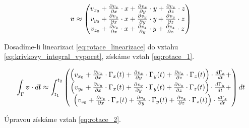 \begin{equation}
\label{eq:rotace_linearizace}
\boldsymbol{v} \approx \begin{pmatrix}
v_{x_0} + \frac{\partial v_x}{\partial x} \cdot x + \frac{\partial v_x}{\partial y} \cdot y + \frac{\partial v_x}{\partial z} \cdot z \\
v_{y_0} + \frac{\partial v_y}{\partial x} \cdot x + \frac{\partial v_y}{\partial y} \cdot y + \frac{\partial v_y}{\partial z} \cdot z \\
v_{z_0} + \frac{\partial v_z}{\partial x} \cdot x + \frac{\partial v_z}{\partial y} \cdot y + \frac{\partial v_z}{\partial z} \cdot z
\end{pmatrix}
\end{equation}

Dosadíme-li linearizaci \eqref{eq:rotace_linearizace} do vztahu \eqref{eq:krivkovy_integral_vypocet}, získáme vztah \eqref{eq:rotace_1}.

\begin{equation}
\label{eq:rotace_1}
\int_\Gamma \boldsymbol{v} \cdot d\boldsymbol{l} \approx
\int_{t_1}^{t_2} \begin{pmatrix}
\left(v_{x_0} + \frac{\partial v_x}{\partial x} \cdot \Gamma_x(t) + \frac{\partial v_x}{\partial y} \cdot \Gamma_y(t) + \frac{\partial v_x}{\partial z} \cdot \Gamma_z(t)\right) \cdot \frac{d \Gamma_x}{dt} + \\
\left(v_{y_0} + \frac{\partial v_y}{\partial x} \cdot \Gamma_x(t) + \frac{\partial v_y}{\partial y} \cdot \Gamma_y(t) + \frac{\partial v_y}{\partial z} \cdot \Gamma_z(t)\right) \cdot \frac{d \Gamma_y}{dt} + \\
\left(v_{z_0} + \frac{\partial v_z}{\partial x} \cdot \Gamma_x(t) + \frac{\partial v_z}{\partial y} \cdot \Gamma_y(t) + \frac{\partial v_z}{\partial z} \cdot \Gamma_z(t)\right) \cdot \frac{d \Gamma_z}{dt}
\end{pmatrix} dt
\end{equation}

Úpravou získáme vztah \eqref{eq:rotace_2}.

